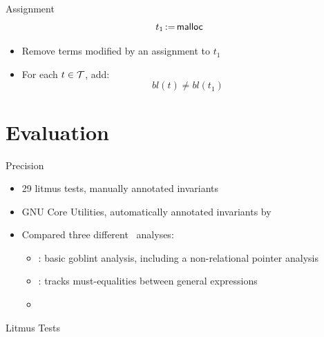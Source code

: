 \documentclass[aspectratio=169]{beamer}
\begin{document}
\begin{frame}{Assignment}
    \[
        t_1\,{:=}\,\textsf{malloc}
    \]
    \begin{itemize}
        \item Remove terms modified by an assignment to $t_1$

        \item For each $t \in \mathcal{T}$, add:
              \[
                  bl(t) \neq bl(t_1)
              \]
    \end{itemize}
\end{frame}

\section{Evaluation}

\begin{frame}{Precision}
    \begin{itemize}
        \item 29 litmus tests, manually annotated invariants
        \item GNU Core Utilities, automatically annotated invariants by \cpo\
        \item Compared three different \goblint\ analyses:
              \begin{itemize}
                  \item \base{}: basic goblint analysis, including a non-relational pointer analysis
                  \item \vareq{}: tracks must-equalities between general expressions
                  \item \cpo\
              \end{itemize}
    \end{itemize}
\end{frame}


\begin{frame}{Litmus Tests}

\end{frame}
\end{document}
